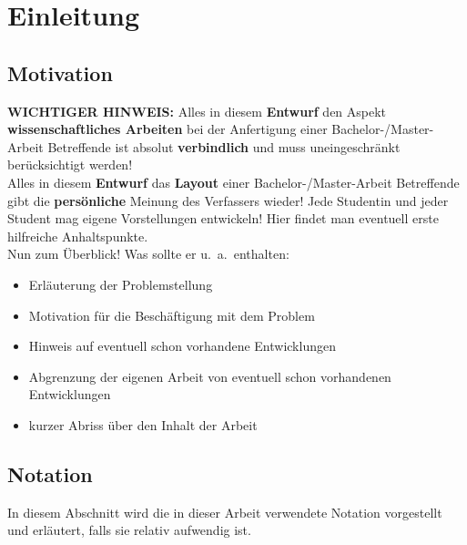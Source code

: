 \chapter{Einleitung}
\label{chap:einleitung}

\section{Motivation}
{\bf WICHTIGER HINWEIS:} 
Alles in diesem {\bf Entwurf} den Aspekt
{\bf wissenschaftliches Arbeiten} bei der Anfertigung einer
Bachelor-/Master-Arbeit 
Betreffende ist absolut {\bf verbindlich} und muss uneingeschränkt
berücksichtigt werden! \\[0.1cm]
Alles in diesem {\bf Entwurf} das 
{\bf Layout} einer Bachelor-/Master-Arbeit Betreffende gibt die 
{\bf persönliche} Meinung des 
Verfassers wieder! Jede Studentin und jeder Student mag eigene Vorstellungen
entwickeln! Hier findet man eventuell erste hilfreiche Anhaltspunkte. \\[0.1cm]
Nun zum Überblick! Was sollte er u.\ a.\ enthalten:
\begin{itemize}
\itemsep -6pt
\item Erläuterung der Problemstellung 
\item Motivation für die Beschäftigung mit dem Problem
\item Hinweis auf eventuell schon vorhandene Entwicklungen 
\item Abgrenzung der eigenen Arbeit von eventuell schon vorhandenen
      Entwicklungen 
\item kurzer Abriss über den Inhalt der Arbeit
\end{itemize}

\section{Notation}
In diesem Abschnitt wird die in dieser Arbeit verwendete Notation 
vorgestellt und erläutert, falls sie relativ aufwendig ist.

